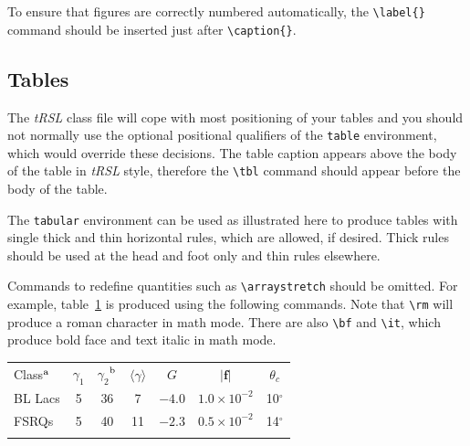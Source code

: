 \documentclass[]{tRSL2e}
\begin{document}
To ensure that figures are correctly numbered automatically, the \verb"\label{}" command should be inserted just
after \verb"\caption{}".


\subsection{Tables}

The {\it tRSL} class file will cope with most positioning of your tables and you should not normally use the optional
positional qualifiers of the {\tt table} environment, which would override these decisions. The table caption
appears above the body of the table in {\it tRSL} style, therefore the \verb"\tbl" command should appear before
the body of the table.

The {\tt tabular} environment can be used as illustrated here to produce tables with single thick and thin horizontal rules, which
are allowed, if desired. Thick rules should be used at the head and foot only and thin rules elsewhere.

Commands to redefine quantities such as \verb"\arraystretch" should be omitted. For example, table~\ref{symbols}
is produced using the following commands. Note that \verb"\rm" will produce a roman character in math mode. There
are also \verb"\bf" and \verb"\it", which produce bold face and text italic in math mode.

\begin{table}
{\begin{tabular}[l]{@{}lcccccc}
\toprule
  Class$^{\rm a}$ & $\gamma _1$ & $\gamma _2$$^{\rm b}$
         & $\langle \gamma \rangle$
         & $G$ & $|{\bm f}|$ & $\theta _{c}$ \\
\colrule
  BL Lacs &5 & 36 & 7 & $-4.0$
         & $1.0\times 10^{-2}$ & 10$^\circ$ \\
  FSRQs & 5 & 40 & 11 & $-2.3$
         & $0.5\times 10^{-2}$ & 14$^\circ$ \\
\botrule
\end{tabular}}
\label{symbols}
\end{table}
\end{document}
